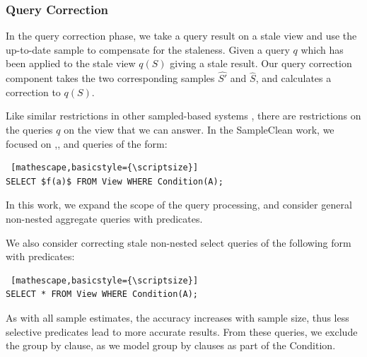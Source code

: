 \subsubsection{Query Correction}
In the query correction phase, we take a query result on a stale view and use the up-to-date sample to compensate for the staleness.
Given a query $q$ which has been applied to the stale view $q(S)$ giving a stale result.
Our query correction component takes the two corresponding samples $\hat{S'}$ and $\hat{S}$, and calculates a correction to $q(S)$.

Like similar restrictions in other sampled-based systems \cite{agarwalknowing}, there are restrictions on the queries $q$ on the view that we can answer. 
In the SampleClean work, we focused on \sumfunc,\countfunc, and \avgfunc queries of the form: 
\begin{lstlisting} [mathescape,basicstyle={\scriptsize}]
SELECT $f(a)$ FROM View WHERE Condition(A);
\end{lstlisting}
In this work, we expand the scope of the query processing, and consider general non-nested aggregate queries with predicates.

We also consider correcting stale non-nested select queries of the following form with predicates:
\begin{lstlisting} [mathescape,basicstyle={\scriptsize}]
SELECT * FROM View WHERE Condition(A);
\end{lstlisting}
As with all sample estimates, the accuracy increases with sample size, thus less selective predicates lead to more accurate results.
From these queries, we exclude the group by clause, as we model group by clauses as part of the \textsf{Condition}.


